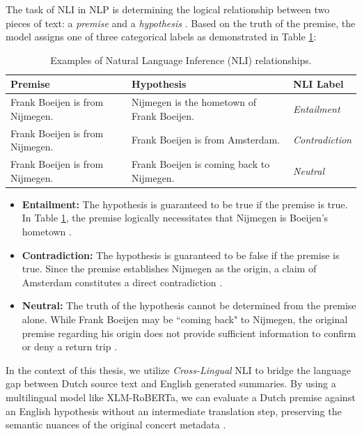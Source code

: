 The task of NLI in NLP is determining the logical relationship between two pieces of text: 
a \textit{premise} and a \textit{hypothesis} \cite{conneau2020unsupervised}. Based on the truth of the premise, 
the model assigns one of three categorical labels as demonstrated in Table \ref{tab:nli_examples}:

\begin{table}[h]
    \centering
    \caption{Examples of Natural Language Inference (NLI) relationships.}
    \label{tab:nli_examples}
    \begin{tabular}{lll}
        \toprule
        \textbf{Premise} & \textbf{Hypothesis} & \textbf{NLI Label} \\
        \midrule
        Frank Boeijen is from Nijmegen. & Nijmegen is the hometown of Frank Boeijen. & \textit{Entailment} \\
        Frank Boeijen is from Nijmegen. & Frank Boeijen is from Amsterdam. & \textit{Contradiction} \\
        Frank Boeijen is from Nijmegen. & Frank Boeijen is coming back to Nijmegen. & \textit{Neutral} \\
        \bottomrule
    \end{tabular}
\end{table}

\begin{itemize}
    \item \textbf{Entailment:} The hypothesis is guaranteed to be true if the premise is true. In Table \ref{tab:nli_examples}, 
    the premise logically necessitates that Nijmegen is Boeijen's hometown \cite{conneau2020unsupervised}.
    \item \textbf{Contradiction:} The hypothesis is guaranteed to be false if the premise is true. 
    Since the premise establishes Nijmegen as the origin, a claim of Amsterdam constitutes a direct contradiction \cite{conneau2020unsupervised}.
    \item \textbf{Neutral:} The truth of the hypothesis cannot be determined from the premise alone. 
    While Frank Boeijen may be ``coming back" to Nijmegen, the original premise regarding his origin does not provide sufficient
     information to confirm or deny a return trip \cite{conneau2020unsupervised}.
\end{itemize}

\noindent In the context of this thesis, we utilize \textit{Cross-Lingual} NLI to bridge the language gap 
between Dutch source text and English generated summaries. By using a multilingual model like XLM-RoBERTa, 
we can evaluate a Dutch premise against an English hypothesis without an intermediate translation step,
 preserving the semantic nuances of the original concert metadata \cite{conneau2020unsupervised}.

